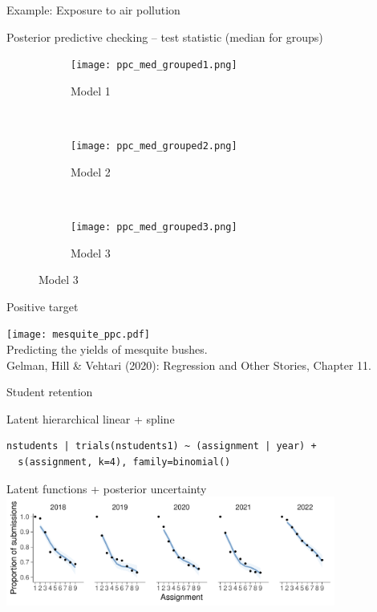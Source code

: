 \documentclass[t]{beamer}
\begin{document}
\begin{frame}{Example: Exposure to air pollution}


  Posterior predictive checking -- test statistic (median for groups)

  \begin{figure}
\centering
\begin{subfigure}{.31\textwidth}
\texttt{[image: ppc\_med\_grouped1.png]}
\caption{Model 1}
\end{subfigure}
~
\begin{subfigure}{.31\textwidth}
\texttt{[image: ppc\_med\_grouped2.png]}
\caption{Model 2}
\end{subfigure}
~
\begin{subfigure}{.31\textwidth}
\texttt{[image: ppc\_med\_grouped3.png]}
\caption{Model 3}
\end{subfigure}

\end{figure}

\end{frame}

\begin{frame}{Positive target}
  
    \texttt{[image: mesquite\_ppc.pdf]}\\
  \vspace{-0.1\baselineskip} {Predicting the yields of mesquite bushes.\\
    \color{gray} \footnotesize
    Gelman, Hill \& Vehtari (2020): Regression and Other Stories, Chapter 11.}\\

\end{frame}

\begin{frame}[fragile]{Student retention}

  Latent hierarchical linear + spline

{\footnotesize
\begin{lstlisting}
nstudents | trials(nstudents1) ~ (assignment | year) +
  s(assignment, k=4), family=binomial()
\end{lstlisting}}

  Latent functions + posterior uncertainty
  \includegraphics[height=3.6cm]{student_retention_sbinom_linpreds.pdf}
  
\end{frame}
\end{document}
